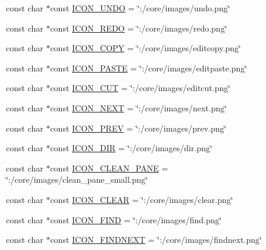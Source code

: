 \begin{DoxyCompactItemize}
const char $\ast$const \hyperlink{group___core_plugin_gabe57fe99b37c20c83b1076cf2ee8f962}{I\-C\-O\-N\-\_\-\-U\-N\-D\-O} = \char`\"{}\-:/core/images/undo.\-png\char`\"{}
\item 
const char $\ast$const \hyperlink{group___core_plugin_ga5790e2eaef746c0c5f24032e09413721}{I\-C\-O\-N\-\_\-\-R\-E\-D\-O} = \char`\"{}\-:/core/images/redo.\-png\char`\"{}
\item 
const char $\ast$const \hyperlink{group___core_plugin_ga1aa8b94ac7d79f0f11134c497e272d21}{I\-C\-O\-N\-\_\-\-C\-O\-P\-Y} = \char`\"{}\-:/core/images/editcopy.\-png\char`\"{}
\item 
const char $\ast$const \hyperlink{group___core_plugin_ga41f876884627c908da22fb2839b7647a}{I\-C\-O\-N\-\_\-\-P\-A\-S\-T\-E} = \char`\"{}\-:/core/images/editpaste.\-png\char`\"{}
\item 
const char $\ast$const \hyperlink{group___core_plugin_gab11796caa2887911728f7c3830344151}{I\-C\-O\-N\-\_\-\-C\-U\-T} = \char`\"{}\-:/core/images/editcut.\-png\char`\"{}
\item 
const char $\ast$const \hyperlink{group___core_plugin_gaf7d00a706b67895a45a1c9638e051693}{I\-C\-O\-N\-\_\-\-N\-E\-X\-T} = \char`\"{}\-:/core/images/next.\-png\char`\"{}
\item 
const char $\ast$const \hyperlink{group___core_plugin_gab369e93f9c88bd1843fb04b69231e36b}{I\-C\-O\-N\-\_\-\-P\-R\-E\-V} = \char`\"{}\-:/core/images/prev.\-png\char`\"{}
\item 
const char $\ast$const \hyperlink{group___core_plugin_gaae28f0cb902b7d5e3b672b7d2a15b68e}{I\-C\-O\-N\-\_\-\-D\-I\-R} = \char`\"{}\-:/core/images/dir.\-png\char`\"{}
\item 
const char $\ast$const \hyperlink{group___core_plugin_ga12e00a8078139b88e0be34566a87cdcc}{I\-C\-O\-N\-\_\-\-C\-L\-E\-A\-N\-\_\-\-P\-A\-N\-E} = \char`\"{}\-:/core/images/clean\-\_\-pane\-\_\-small.\-png\char`\"{}
\item 
const char $\ast$const \hyperlink{group___core_plugin_gaba4bc39566611b656f779c8a25e5ca32}{I\-C\-O\-N\-\_\-\-C\-L\-E\-A\-R} = \char`\"{}\-:/core/images/clear.\-png\char`\"{}
\item 
const char $\ast$const \hyperlink{group___core_plugin_ga3b89c61f0a84e424e59a4ced77dfc7d6}{I\-C\-O\-N\-\_\-\-F\-I\-N\-D} = \char`\"{}\-:/core/images/find.\-png\char`\"{}
\item 
const char $\ast$const \hyperlink{group___core_plugin_ga324b946ec6414fd10710ae775d10aa96}{I\-C\-O\-N\-\_\-\-F\-I\-N\-D\-N\-E\-X\-T} = \char`\"{}\-:/core/images/findnext.\-png\char`\"{}

\end{DoxyCompactItemize}
